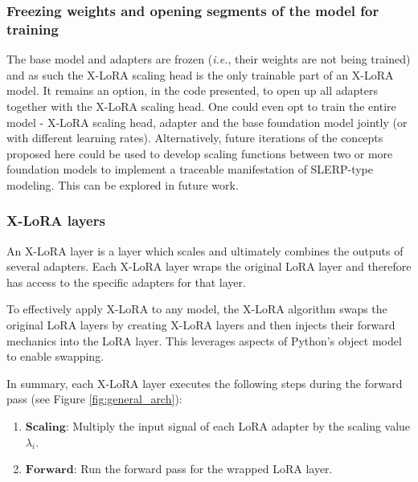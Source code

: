 \subsubsection{Freezing weights and opening segments of the model for training}
The base model and adapters are frozen ({\it i.e.}, their weights are not being trained) and as such the X-LoRA scaling head is the only trainable part of an X-LoRA model. It remains an option, in the code presented, to open up all adapters together with the X-LoRA scaling head. One could even opt to train the entire model - X-LoRA scaling head, adapter and the base foundation model jointly (or with different learning rates). Alternatively, future iterations of the concepts proposed here could be used to develop scaling functions between two or more foundation models to implement a traceable manifestation of SLERP-type modeling. This can be explored in future work. 

\subsubsection{X-LoRA layers}
An X-LoRA layer is a layer which scales and ultimately combines the outputs of several adapters. Each X-LoRA layer wraps the original LoRA layer and therefore has access to the specific adapters for that layer.

To effectively apply X-LoRA to any model, the X-LoRA algorithm swaps the original LoRA layers by creating X-LoRA layers and then injects their forward mechanics into the LoRA layer. This leverages aspects of Python's object model to enable swapping.

In summary, each X-LoRA layer executes the following steps during the forward pass (see Figure \ref{fig:general_arch}):
\begin{enumerate}
    \item $\mathbf{Scaling}$: Multiply the input signal of each LoRA adapter by the scaling value $\lambda_i$.
    \item $\mathbf{Forward}$: Run the forward pass for the wrapped LoRA layer.
\end{enumerate}


